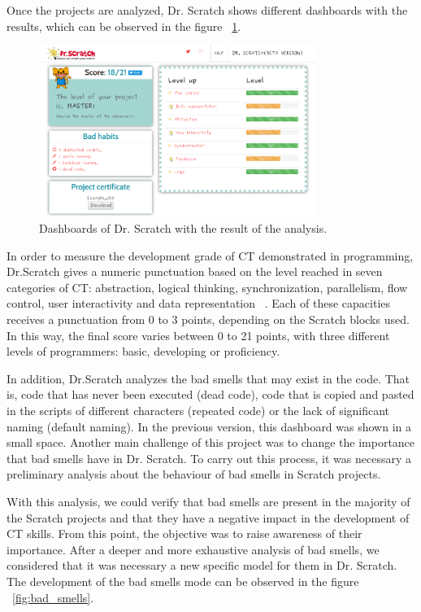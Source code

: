 Once the projects are analyzed, Dr. Scratch shows different dashboards with the results, which can be observed in the figure ~\ref{fig:dashboards}.

\begin{figure}[h]
  \centering
  \includegraphics[width=9cm, keepaspectratio]{img/dashboards.png}
  \caption{Dashboards of Dr. Scratch with the result of the analysis.}
  \label{fig:dashboards}
\end{figure}

In order to measure the development grade of CT demonstrated in programming, Dr.Scratch gives a numeric punctuation based on the level reached in seven categories of CT: abstraction, logical thinking, synchronization, parallelism, flow control, user interactivity and data representation ~\cite{moreno2015dr}. Each of these capacities receives a punctuation from 0 to 3 points, depending on the Scratch blocks used. In this way, the final score varies between 0 to 21 points, with three different levels of programmers: basic, developing or proficiency.   

In addition, Dr.Scratch analyzes the bad smells that may exist in the code. That is, code that has never been executed (dead code), code that is copied and pasted in the scripts of different characters (repeated code) or the lack of significant naming (default naming). In the previous version, this dashboard was shown in a small space. Another main challenge of this project was to change the importance that bad smells have in Dr. Scratch. To carry out this process, it was necessary a preliminary analysis about the behaviour of bad smells in Scratch projects.

With this analysis, we could verify that bad smells are present in the majority of the Scratch projects and that they have a negative impact in the development of CT skills. From this point, the objective was to raise awareness of their importance. After a deeper and more exhaustive analysis of bad smells, we considered that it was necessary a new specific model for them in Dr. Scratch. The development of the bad smells mode can be observed in the figure ~\ref{fig:bad_smells}.

